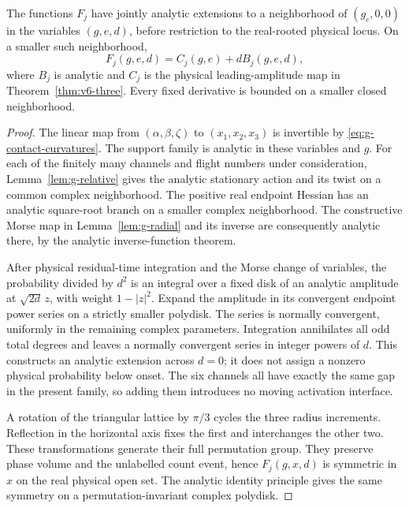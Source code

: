 \begin{lemma}
\label{lem:v8-descent}
The functions $F_j$ have jointly analytic extensions to a neighborhood
of $(g_c,0,0)$ in the variables $(g,e,d)$, before restriction to the
real-rooted physical locus. On a smaller such neighborhood,
\begin{equation}\label{eq:v8-analytic-expansion}
                     F_j(g,e,d)=C_j(g,e)+d B_j(g,e,d),
\end{equation}
where $B_j$ is analytic and $C_j$ is the physical leading-amplitude map
in Theorem~\ref{thm:v6-three}. Every fixed derivative is bounded on a
smaller closed neighborhood.
\end{lemma}
\begin{proof}
The linear map from $(\alpha,\beta,\zeta)$ to $(x_1,x_2,x_3)$ is
invertible by \eqref{eq:g-contact-curvatures}. The support family is
analytic in these variables and $g$. For each of the finitely many
channels and flight numbers under consideration,
Lemma~\ref{lem:g-relative} gives the analytic stationary action and
its twist on a common complex neighborhood. The positive real endpoint
Hessian has an analytic square-root branch on a smaller complex
neighborhood. The constructive Morse map in Lemma~\ref{lem:g-radial}
and its inverse are consequently analytic there, by the analytic
inverse-function theorem.

After physical residual-time integration and the Morse change of
variables, the probability divided by $d^2$ is an integral over a fixed
disk of an analytic amplitude at $\sqrt{2d}\,z$, with weight
$1-|z|^2$. Expand the amplitude in its convergent endpoint power series
on a strictly smaller polydisk. The series is normally convergent,
uniformly in the remaining complex parameters. Integration annihilates
all odd total degrees and leaves a normally convergent series in integer
powers of $d$. This constructs an analytic extension across $d=0$;
it does not assign a nonzero physical probability below onset. The six
channels all have exactly the same gap in the present family, so adding
them introduces no moving activation interface.

A rotation of the triangular lattice by $\pi/3$ cycles the three radius
increments. Reflection in the horizontal axis fixes the first and
interchanges the other two. These transformations generate their full
permutation group. They preserve phase volume and the unlabelled count
event, hence $F_j(g,x,d)$ is symmetric in $x$ on the real physical open
set. The analytic identity principle gives the same symmetry on a
permutation-invariant complex polydisk.


\end{proof}
